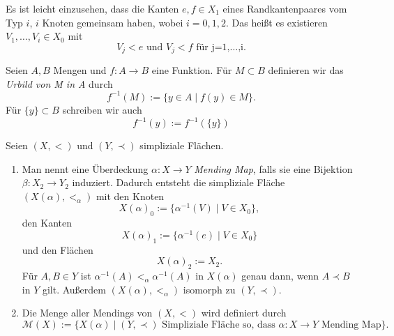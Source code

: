 \documentclass[12pt,titlepage]{article}
\begin{document}
 \begin{bemerkung}
 Es ist leicht einzusehen, dass die Kanten $e,f \in X_1$ eines Randkantenpaares vom Typ $i$, $i$ Knoten gemeinsam haben, wobei $i=0,1,2$. Das heißt es existieren $V_1,\ldots,V_i \in X_0$ mit 
\[
V_j <e \text{ und } V_j <f \text{ für j=1,\ldots,i}.
\]

 \end{bemerkung}
 
\begin{bemerkung}
Seien $A,B$ Mengen und $f:A \to B$ eine Funktion. Für $M \subset B$ definieren wir das \emph{Urbild von M in A} durch 
\[
f^{-1}(M):=\{y\in A \mid f(y)\in M\}.
\]
Für $\{y\} \subset B$ schreiben wir auch
\[
f^{-1}(y):=f^{-1}(\{y\})
\]
\end{bemerkung}
  \begin{definition}
  Seien $(X,<)$ und $(Y,\prec)$ simpliziale Flächen.
  \begin{enumerate}
  \item Man nennt eine Überdeckung $\alpha:X \to Y$ \emph{Mending Map}, falls sie eine Bijektion $\beta : X_{2}\to Y_{2}$ induziert. Dadurch entsteht die simpliziale Fläche $(X(\alpha),<_{\alpha})$ mit den Knoten
  \[
X(\alpha)_0:=\{\alpha^{-1}(V)\mid V \in X_0 \},
  \] 
  den Kanten 
  \[
X(\alpha)_1:=\{\alpha^{-1}(e)\mid V \in X_0 \} 
  \]
 und den Flächen 
  \[
X(\alpha)_2:=X_2  .
  \]
  Für $A,B \in Y$ ist $\alpha^{-1}(A)<_{\alpha}\alpha^{-1}(A)$ in $X(\alpha)$ genau dann, wenn $A \prec B  $ in $Y$ gilt. Außerdem $(X(\alpha),<_{\alpha})$ isomorph zu $(Y,\prec)$.

  \item Die Menge aller Mendings von $(X,<)$ wird definiert durch 
\[
\mathcal{M}(X):=\{X(\alpha )\mid
 \text{$(Y,\prec )$ Simpliziale Fläche so, dass  $\alpha : X \to Y$ Mending Map}
 \}  .
\]

  \end{enumerate}
  \end{definition}
  
\end{document}
